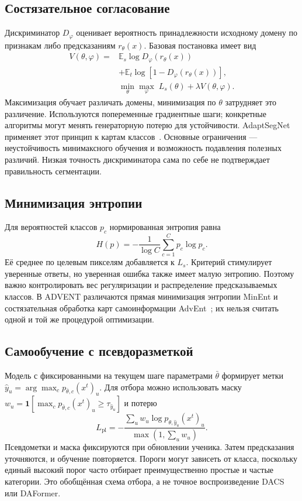 \subsection{Состязательное согласование}
Дискриминатор $D_\varphi$ оценивает вероятность принадлежности исходному домену по признакам либо предсказаниям $r_\theta(x)$. Базовая постановка имеет вид
\begin{equation}
 \begin{split}
 V(\theta,\varphi)={}&\mathbb E_s\log D_\varphi(r_\theta(x))\\
 &+\mathbb E_t\log[1-D_\varphi(r_\theta(x))],\\
 &\min_\theta\max_\varphi\;L_s(\theta)+\lambda V(\theta,\varphi).
 \end{split}
\end{equation}
Максимизация обучает различать домены, минимизация по $\theta$ затрудняет это различение. Используются попеременные градиентные шаги; конкретные алгоритмы могут менять генераторную потерю для устойчивости. AdaptSegNet применяет этот принцип к картам классов~\cite{tsai}. Основные ограничения --- неустойчивость минимаксного обучения и возможность подавления полезных различий. Низкая точность дискриминатора сама по себе не подтверждает правильность сегментации.

\subsection{Минимизация энтропии}
Для вероятностей классов $p_c$ нормированная энтропия равна
\begin{equation}
 H(p)=-\frac1{\log C}\sum_{c=1}^{C}p_c\log p_c.
\end{equation}
Её среднее по целевым пикселям добавляется к $L_s$. Критерий стимулирует уверенные ответы, но уверенная ошибка также имеет малую энтропию. Поэтому важно контролировать вес регуляризации и распределение предсказываемых классов. В ADVENT различаются прямая минимизация энтропии MinEnt и состязательная обработка карт самоинформации AdvEnt~\cite{advent}; их нельзя считать одной и той же процедурой оптимизации.

\subsection{Самообучение с псевдоразметкой}
Модель с фиксированными на текущем шаге параметрами $\bar\theta$ формирует метки $\hat y_u=\arg\max_c p_{\bar\theta,c}(x^t)_u$. Для отбора можно использовать маску $w_u=\mathbf1[\max_c p_{\bar\theta,c}(x^t)_u\geq\tau_{\hat y_u}]$ и потерю
\begin{equation}
 L_{\mathrm{pl}}=-\frac{\sum_u w_u\log p_{\theta,\hat y_u}(x^t)_u}
 {\max(1,\sum_u w_u)}.
\end{equation}
Псевдометки и маска фиксируются при обновлении ученика. Затем предсказания уточняются, и обучение повторяется. Пороги могут зависеть от класса, поскольку единый высокий порог часто отбирает преимущественно простые и частые категории. Это обобщённая схема отбора, а не точное воспроизведение DACS или DAFormer.

